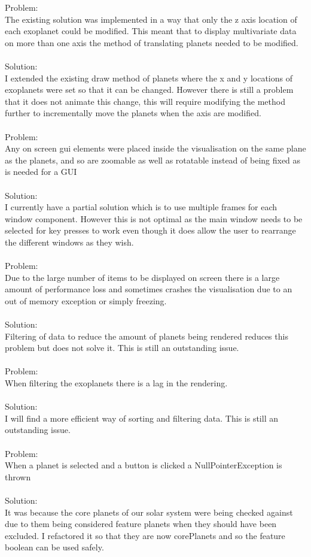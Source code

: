 \documentclass[11pt
              , a4paper
              , twoside
              , openright
              ]{report}
\begin{document}
Problem:\\
The existing solution was implemented in a way that only the z axis location of each exoplanet could be modified. This meant that to display multivariate data on more than one axis the method of translating planets needed to be modified.
\\\\
Solution:\\
I extended the existing draw method of planets where the x and y locations of exoplanets were set so that it can be changed. However there is still a problem that it does not animate this change, this will require modifying the method further to incrementally move the planets when the axis are modified.
\\\\
Problem:\\
Any on screen gui elements were placed inside the visualisation on the same plane as the planets, and so are zoomable as well as rotatable instead of being fixed as is needed for a GUI
\\\\
Solution:\\
I currently have a partial solution which is to use multiple frames for each window component. However this is not optimal as the main window needs to be selected for key presses to work even though it does allow the user to rearrange the different windows as they wish. 
\\\\
Problem: \\
Due to the large number of items to be displayed on screen there is a large amount of performance loss and sometimes crashes the visualisation due to an out of memory exception or simply freezing.
\\\\
Solution:\\
Filtering of data to reduce the amount of planets being rendered reduces this problem but does not solve it. This is still an outstanding issue.
\\\\
Problem:\\
When filtering the exoplanets there is a lag in the rendering. 
\\\\
Solution:\\
I will find a more efficient way of sorting and filtering data. This is still an outstanding issue.
\\\\
Problem:\\
When a planet is selected and a button is clicked a NullPointerException is thrown
\\\\
Solution:\\
It was because the core planets of our solar system were being checked against due to them being considered feature planets when they should have been excluded. I refactored it so that they are now corePlanets and so the feature boolean can be used safely.
\end{document}
